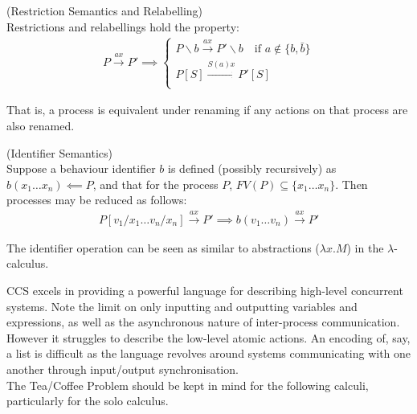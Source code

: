    \begin{definition}{(Restriction Semantics and Relabelling)\\}
        Restrictions and relabellings hold the property:
        \begin{align}
            P \xrightarrow{a x} P' \implies
            \begin{cases}
                P \backslash b \xrightarrow{a x} P ' \backslash b \quad \text{if } a \notin \{b, \bar{b}\}\\
                P[S] \xrightarrow{S(a) x} P'[S] \\
            \end{cases}
        \end{align}
    \end{definition}
    That is, a process is equivalent under renaming if any actions on that process are also renamed.


    \begin{definition}{(Identifier Semantics)\\}
        Suppose a behaviour identifier $b$ is defined (possibly recursively) as $b(x_1 \ldots x_n) \impliedby P$, and that for the process $P$, $FV(P) \subseteq \{x_1 \ldots x_n\}$.
        Then processes may be reduced as follows:
        \begin{align}
            P[v_1 / x_1 \ldots v_n / x_n] \xrightarrow{a x} P' \implies
            b(v_1 \ldots v_n) \xrightarrow{a x} P'
        \end{align}
    \end{definition}
    The identifier operation can be seen as similar to abstractions ($\lambda x . M$) in the $\lambda$-calculus.


    \begin{remarks}
        CCS excels in providing a powerful language for describing high-level concurrent systems.
        Note the limit on only inputting and outputting variables and expressions, as well as the asynchronous nature of inter-process communication.
        However it struggles to describe the low-level atomic actions.
        An encoding of, say, a list is difficult as the language revolves around systems communicating with one another through input/output synchronisation. \\

        The Tea/Coffee Problem should be kept in mind for the following calculi, particularly for the solo calculus.
    \end{remarks}
